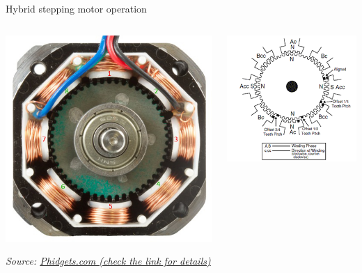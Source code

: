 \documentclass[compress]{beamer}
\newcommand{\source}[2]{{\tiny\it Source: \href{#1}{#2}}}
\begin{document}
\begin{frame}{Hybrid stepping motor operation}
    \begin{center}
        \begin{columns}
            \begin{column}{0.5\linewidth}
        \includegraphics[width=\linewidth]{hybrid}

        \source{https://www.phidgets.com/docs/Stepper_Motor_and_Controller_Primer}{Phidgets.com (check the link for details)}
                
            \end{column}
            \begin{column}{0.5\linewidth}
        \includegraphics[width=\linewidth]{hybrid-operation}


\end{column}
\end{columns}
\end{center}
\end{frame}
\end{document}
